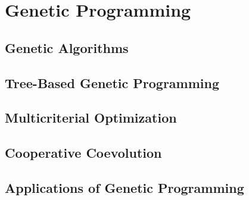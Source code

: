 \chapter{Genetic Programming}
\section{Genetic Algorithms}
\section{Tree-Based Genetic Programming}
\section{Multicriterial Optimization}
\section{Cooperative Coevolution}
\section{Applications of Genetic Programming}